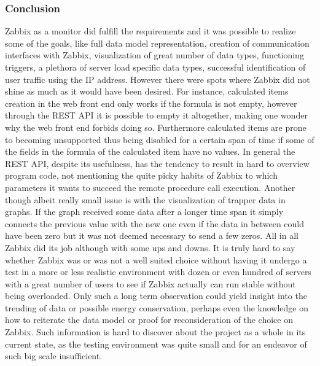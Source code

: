 \subsubsection{Conclusion}
	Zabbix as a monitor did fulfill the requirements and it was possible to realize some of the goals, like full data model representation, creation of communication interfaces with Zabbix, visualization of great number of data types, functioning triggers, a plethora of server load specific data types, successful identification of user traffic using the IP address. However there were spots where Zabbix did not shine as much as it would have been desired. For instance, calculated items creation in the web front end only works if the formula is not empty, however through the REST API it is possible to empty it altogether, making one wonder why the web front end forbids doing so. Furthermore calculated items are prone to becoming unsupported thus being disabled for a certain span of time if some of the fields in the formula of the calculated item have no values. In general the REST API, despite its usefulness, has the tendency to result in hard to overview program code, not mentioning the quite picky habits of Zabbix to which parameters it wants to succeed the remote procedure call execution. Another though albeit really small issue is with the visualization of trapper data in graphs. If the graph received some data after a longer time span it simply connects the previous value with the new one even if the data in between could have been zero but it was not deemed necessary to send a few zeros.
	All in all Zabbix did its job although with some ups and downs. It is truly hard to say whether Zabbix was or was not a well suited choice without having it undergo a test in a more or less realistic environment with dozen or even hundred of servers with a great number of users to see if Zabbix actually can run stable without being overloaded. Only such a long term observation could yield insight into the trending of data or possible energy conservation, perhaps even the knowledge on how to reiterate the data model or proof for reconsideration of the choice on Zabbix. Such information is hard to discover about the project as a whole in its current state, as the testing environment was quite small and for an endeavor of such big scale insufficient.